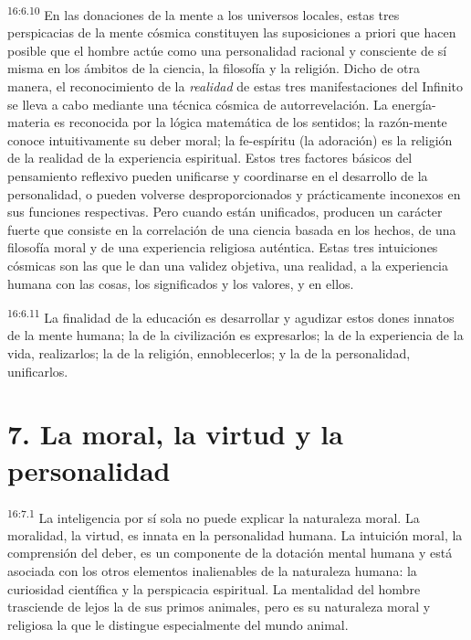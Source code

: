 \par
\textsuperscript{16:6.10} En las donaciones de la mente a los universos locales, estas tres perspicacias de la mente cósmica constituyen las suposiciones a priori que hacen posible que el hombre actúe como una personalidad racional y consciente de sí misma en los ámbitos de la ciencia, la filosofía y la religión. Dicho de otra manera, el reconocimiento de la \textit{realidad} de estas tres manifestaciones del Infinito se lleva a cabo mediante una técnica cósmica de autorrevelación. La energía-materia es reconocida por la lógica matemática de los sentidos; la razón-mente conoce intuitivamente su deber moral; la fe-espíritu (la adoración) es la religión de la realidad de la experiencia espiritual. Estos tres factores básicos del pensamiento reflexivo pueden unificarse y coordinarse en el desarrollo de la personalidad, o pueden volverse desproporcionados y prácticamente inconexos en sus funciones respectivas. Pero cuando están unificados, producen un carácter fuerte que consiste en la correlación de una ciencia basada en los hechos, de una filosofía moral y de una experiencia religiosa auténtica. Estas tres intuiciones cósmicas son las que le dan una validez objetiva, una realidad, a la experiencia humana con las cosas, los significados y los valores, y en ellos.

\par
\textsuperscript{16:6.11} La finalidad de la educación es desarrollar y agudizar estos dones innatos de la mente humana; la de la civilización es expresarlos; la de la experiencia de la vida, realizarlos; la de la religión, ennoblecerlos; y la de la personalidad, unificarlos.

\section*{7. La moral, la virtud y la personalidad}
\par
\textsuperscript{16:7.1} La inteligencia por sí sola no puede explicar la naturaleza moral. La moralidad, la virtud, es innata en la personalidad humana. La intuición moral, la comprensión del deber, es un componente de la dotación mental humana y está asociada con los otros elementos inalienables de la naturaleza humana: la curiosidad científica y la perspicacia espiritual. La mentalidad del hombre trasciende de lejos la de sus primos animales, pero es su naturaleza moral y religiosa la que le distingue especialmente del mundo animal.

